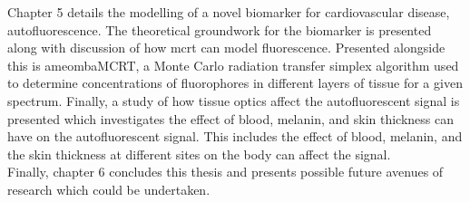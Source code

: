 Chapter 5 details the modelling of a novel biomarker for cardiovascular disease, autofluorescence.
The theoretical groundwork for the biomarker is presented along with discussion of how \gls*{mcrt} can model fluorescence.
Presented alongside this is ameombaMCRT, a Monte Carlo radiation transfer simplex algorithm used to determine concentrations of fluorophores in different layers of tissue for a given spectrum.
Finally, a study of how tissue optics affect the autofluorescent signal is presented which investigates the effect of blood, melanin, and skin thickness can have on the autofluorescent signal.
This includes the effect of blood, melanin, and the skin thickness at different sites  on the body can affect the signal.\\


Finally, chapter 6 concludes this thesis and presents possible future avenues of research which could be undertaken.